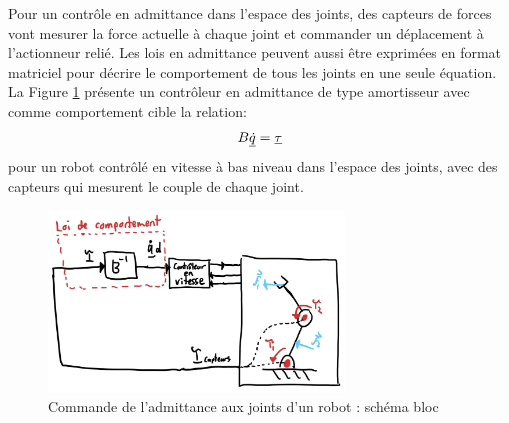Pour un contrôle en admittance dans l'espace des joints, des capteurs de forces vont mesurer la force actuelle à chaque joint et commander un déplacement à l'actionneur relié. Les lois en admittance peuvent aussi être exprimées en format matriciel pour décrire le comportement de tous les joints en une seule équation. La Figure \ref{fig:admitancecontroljointspace1} présente un contrôleur en admittance de type amortisseur avec comme comportement cible la relation:
\begin{align}
	B \underline{\dot{q}} = \underline{\tau}
\end{align}
pour un robot contrôlé en vitesse à bas niveau dans l'espace des joints, avec des capteurs qui mesurent le couple de chaque joint.
\begin{figure}[th]
	\centering
	\includegraphics[width=0.70\textwidth]{fig/admitancecontroljointspace1.jpg}
	\caption{Commande de l'admittance aux joints d'un robot : schéma bloc}
	\label{fig:admitancecontroljointspace1}
\end{figure}

